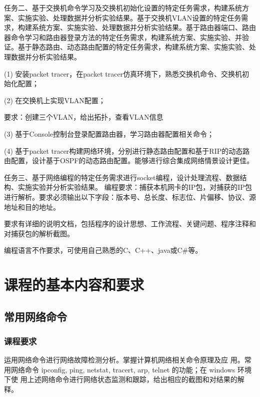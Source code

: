 \documentclass[UTF8,12pt,a4paper]{ctexart}
\begin{document}
 任务二、基于交换机命令学习及交换机初始化设置的特定任务需求，构建系统方案、实施实验、处理数据并分析实验结果。基于交换机VLAN设置的特定任务需求，构建系统方案、实施实验、处理数据并分析实验结果。基于路由器端口、路由器命令学习和路由器登录方法的特定任务需求，构建系统方案、实施实验、并验证。基于静态路由、动态路由配置的特定任务需求，构建系统方案、实施实验、处理数据并分析实验结果。
 
 (1) 安装packet tracer，在packet tracer仿真环境下，熟悉交换机命令、交换机初始化配置；
 
 (2) 在交换机上实现VLAN配置；
 
 要求：创建三个VLAN，给出拓扑，查看VLAN信息
 
 (3) 基于Console控制台登录配置路由器，学习路由器配置相关命令；
 
 (4) 基于packet tracer构建网络环境，分别进行静态路由配置和基于RIP的动态路由配置，设计基于OSPF的动态路由配置。能够进行综合集成网络情景设计更佳。

 任务三、基于网络编程的特定任务需求进行socket编程，设计处理流程、数据结构、实施实验并分析实验结果。
 编程要求：捕获本机网卡的IP包，对捕获的IP包进行解析。要求必须输出以下字段：版本号、总长度、标志位、片偏移、协议、源地址和目的地址。
 
 要求有详细的说明文档，包括程序的设计思想、工作流程、关键问题、程序注释和对捕获包的解析截图。
 
 编程语言不作要求，可使用自己熟悉的C、C++、java或C#等。

\newpage

\section{课程的基本内容和要求}

\subsection{常用网络命令}

\subsubsection{课程要求}
运用网络命令进行网络故障检测分析。掌握计算机网络相关命令原理及应
用。常用网络命令 ipconfig, ping, netstat, tracert, arp, telnet 的功能；在 windows 环境下使
用上述网络命令进行网络状态监测和跟踪，给出相应的截图和对结果的解释。
\end{document}
